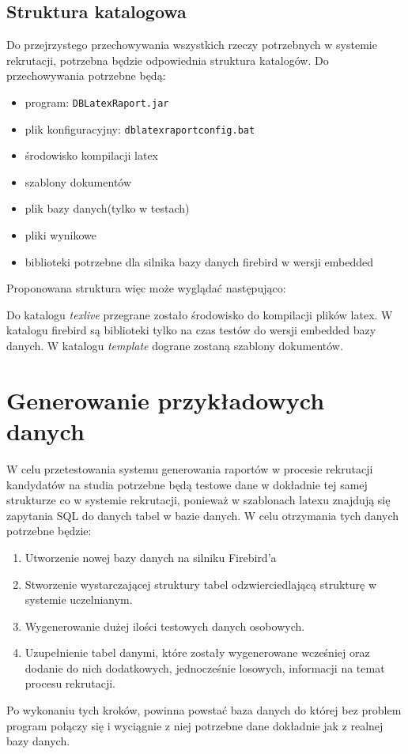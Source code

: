 \subsection{Struktura katalogowa}

Do przejrzystego przechowywania wszystkich rzeczy potrzebnych w systemie rekrutacji, potrzebna będzie odpowiednia struktura katalogów. Do przechowywania potrzebne będą: \\
\begin{itemize}
\item program: \texttt{DBLatexRaport.jar}
\item plik konfiguracyjny: \texttt{dblatexraportconfig.bat}
\item środowisko kompilacji latex
\item szablony dokumentów 
\item plik bazy danych(tylko w testach)
\item pliki wynikowe
\item biblioteki potrzebne dla silnika bazy danych firebird w wersji embedded \\
\end{itemize}

Proponowana struktura więc może wyglądać następująco:

\vspace{5mm}
Do katalogu \emph{texlive} przegrane zostało środowisko do kompilacji plików latex. W katalogu firebird są biblioteki tylko na czas testów do wersji embedded bazy danych. W katalogu \emph{template} dograne zostaną szablony dokumentów.


\section{ Generowanie przykładowych danych}

W celu przetestowania systemu generowania raportów w procesie rekrutacji kandydatów na studia potrzebne będą testowe dane w dokładnie tej samej strukturze co w systemie rekrutacji, ponieważ w szablonach latexu znajdują się zapytania SQL do danych tabel w bazie danych. 
W celu otrzymania tych danych potrzebne będzie:
\begin{enumerate}

\item	Utworzenie nowej bazy danych na silniku Firebird’a 
\item	Stworzenie wystarczającej struktury tabel odzwierciedlającą strukturę w systemie uczelnianym.
\item	Wygenerowanie dużej ilości testowych danych osobowych.
\item	Uzupełnienie tabel danymi, które zostały wygenerowane wcześniej oraz dodanie do nich dodatkowych, jednocześnie losowych, informacji na temat procesu rekrutacji.
\vspace{5mm}
\end{enumerate}
Po wykonaniu tych kroków, powinna powstać baza danych do której bez problem program połączy się i wyciągnie z niej potrzebne dane dokładnie jak z realnej bazy danych.

